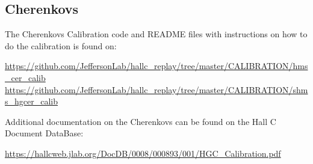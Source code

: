 \documentclass[14pt]{article}
\begin{document}
\subsection{Cherenkovs}
The Cherenkovs Calibration code and README files with instructions on how to do the calibration is found on:
\begin{center}
  \url{https://github.com/JeffersonLab/hallc_replay/tree/master/CALIBRATION/hms_cer_calib} \\
  \url{https://github.com/JeffersonLab/hallc_replay/tree/master/CALIBRATION/shms_hgcer_calib}
\end{center}
Additional documentation on the Cherenkovs can be found on the Hall C Document DataBase:
\begin{center}
\url{https://hallcweb.jlab.org/DocDB/0008/000893/001/HGC_Calibration.pdf}
\end{center}
\newpage
\end{document}
